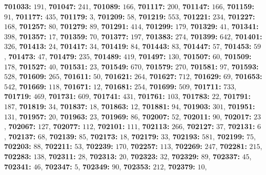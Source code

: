 \textsf{\bfseries 701033:} $191$, \textsf{\bfseries 701047:} $241$, \textsf{\bfseries 701089:} $166$, \textsf{\bfseries 701117:} $200$, \textsf{\bfseries 701147:} $166$, \textsf{\bfseries 701159:} $91$, \textsf{\bfseries 701177:} $435$, \textsf{\bfseries 701179:} $3$, \textsf{\bfseries 701209:} $58$, \textsf{\bfseries 701219:} $553$, \textsf{\bfseries 701221:} $234$, \textsf{\bfseries 701227:} $168$, \textsf{\bfseries 701257:} $80$, \textsf{\bfseries 701279:} $89$, \textsf{\bfseries 701291:} $414$, \textsf{\bfseries 701299:} $179$, \textsf{\bfseries 701329:} $41$, \textsf{\bfseries 701341:} $398$, \textsf{\bfseries 701357:} $17$, \textsf{\bfseries 701359:} $70$, \textsf{\bfseries 701377:} $197$, \textsf{\bfseries 701383:} $274$, \textsf{\bfseries 701399:} $642$, \textsf{\bfseries 701401:} $326$, \textsf{\bfseries 701413:} $24$, \textsf{\bfseries 701417:} $34$, \textsf{\bfseries 701419:} $84$, \textsf{\bfseries 701443:} $83$, \textsf{\bfseries 701447:} $57$, \textsf{\bfseries 701453:} $59$, \textsf{\bfseries 701473:} $47$, \textsf{\bfseries 701479:} $235$, \textsf{\bfseries 701489:} $419$, \textsf{\bfseries 701497:} $130$, \textsf{\bfseries 701507:} $60$, \textsf{\bfseries 701509:} $178$, \textsf{\bfseries 701527:} $40$, \textsf{\bfseries 701531:} $23$, \textsf{\bfseries 701549:} $670$, \textsf{\bfseries 701579:} $270$, \textsf{\bfseries 701581:} $97$, \textsf{\bfseries 701593:} $528$, \textsf{\bfseries 701609:} $265$, \textsf{\bfseries 701611:} $50$, \textsf{\bfseries 701621:} $264$, \textsf{\bfseries 701627:} $712$, \textsf{\bfseries 701629:} $69$, \textsf{\bfseries 701653:} $542$, \textsf{\bfseries 701669:} $118$, \textsf{\bfseries 701671:} $12$, \textsf{\bfseries 701681:} $254$, \textsf{\bfseries 701699:} $509$, \textsf{\bfseries 701711:} $733$, \textsf{\bfseries 701719:} $469$, \textsf{\bfseries 701731:} $609$, \textsf{\bfseries 701741:} $431$, \textsf{\bfseries 701761:} $103$, \textsf{\bfseries 701783:} $22$, \textsf{\bfseries 701791:} $187$, \textsf{\bfseries 701819:} $34$, \textsf{\bfseries 701837:} $18$, \textsf{\bfseries 701863:} $12$, \textsf{\bfseries 701881:} $94$, \textsf{\bfseries 701903:} $301$, \textsf{\bfseries 701951:} $131$, \textsf{\bfseries 701957:} $20$, \textsf{\bfseries 701963:} $23$, \textsf{\bfseries 701969:} $86$, \textsf{\bfseries 702007:} $52$, \textsf{\bfseries 702011:} $90$, \textsf{\bfseries 702017:} $23$, \textsf{\bfseries 702067:} $127$, \textsf{\bfseries 702077:} $112$, \textsf{\bfseries 702101:} $111$, \textsf{\bfseries 702113:} $266$, \textsf{\bfseries 702127:} $37$, \textsf{\bfseries 702131:} $6$, \textsf{\bfseries 702137:} $68$, \textsf{\bfseries 702139:} $85$, \textsf{\bfseries 702173:} $18$, \textsf{\bfseries 702179:} $33$, \textsf{\bfseries 702193:} $581$, \textsf{\bfseries 702199:} $75$, \textsf{\bfseries 702203:} $88$, \textsf{\bfseries 702211:} $53$, \textsf{\bfseries 702239:} $170$, \textsf{\bfseries 702257:} $113$, \textsf{\bfseries 702269:} $247$, \textsf{\bfseries 702281:} $215$, \textsf{\bfseries 702283:} $138$, \textsf{\bfseries 702311:} $28$, \textsf{\bfseries 702313:} $20$, \textsf{\bfseries 702323:} $32$, \textsf{\bfseries 702329:} $89$, \textsf{\bfseries 702337:} $45$, \textsf{\bfseries 702341:} $46$, \textsf{\bfseries 702347:} $5$, \textsf{\bfseries 702349:} $90$, \textsf{\bfseries 702353:} $212$, \textsf{\bfseries 702379:} $10$, 
